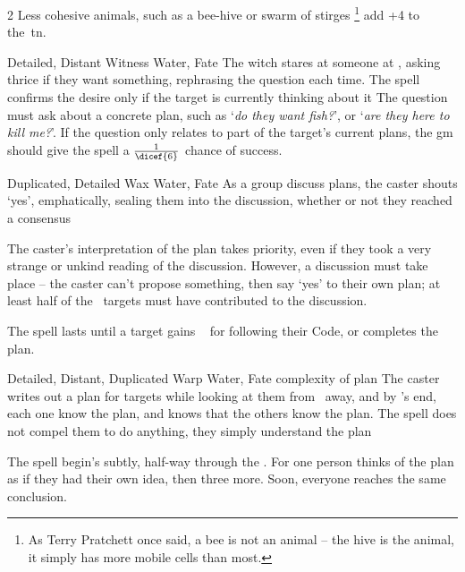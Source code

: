 \begin{multicols}{2}
{  Less cohesive animals, such as a bee-hive or swarm of stirges%
  \footnote{As Terry Pratchett once said, a bee is not an animal -- the hive is the animal, it simply has more mobile cells than most.}
  add +4 to the~\gls{tn}.
  }

  {Detailed, Distant}%
  {Witness}%
  {Water, Fate}%
  {}%
  {The \gls{witch} stares at someone at \spellRange, asking thrice if they want something, rephrasing the question each time.
  The \gls{spell} confirms the desire only if the target is currently thinking about it}%
  {%
    The question must ask about a concrete plan, such as `\textit{do they want fish?}', or `\textit{are they here to kill me?}'.
    If the question only relates to part of the target's current plans, the \gls{gm} should give the \gls{spell} a $\frac{1}{\dicef{6}}$ chance of success.
  }


  {Duplicated, Detailed}%
  {Wax}%
  {Water, Fate}%
  {}%
  {As a group discuss plans, the caster shouts `yes', emphatically, sealing them into the discussion, whether or not they reached a consensus}%
  {The caster's interpretation of the plan takes priority, even if they took a very strange or unkind reading of the discussion.
  However, a discussion must take place -- the caster can't propose something, then say `yes' to their own plan; at least half of the ~targets must have contributed to the discussion.

  The spell lasts until a target gains ~ for following their Code, or completes the plan.}



  {Detailed, Distant, Duplicated}%
  {Warp}%
  {Water, Fate}%
  {complexity of plan}%
  {The caster writes out a plan for  targets while looking at them from \spellRange\ away, and by \showOnset's end, each one know the plan, and knows that the others know the plan.
  The spell does not compel them to do anything, they simply understand the plan}%
  {
  The spell begin's subtly, half-way through the \showOnset.
  For one person thinks of the plan as if they had their own idea, then three more.
  Soon, everyone reaches the same conclusion.

}
\end{multicols}
